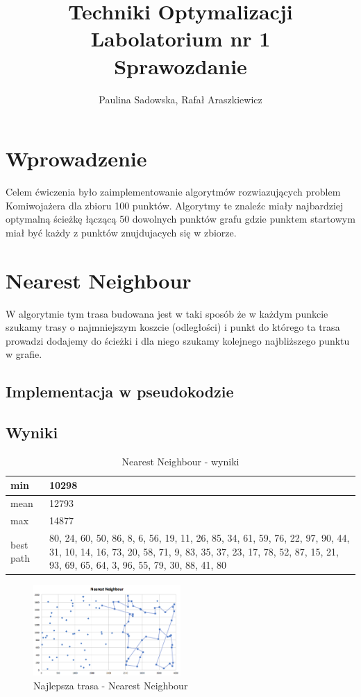 \documentclass[a4paper 10pt]{article}
\title{\textbf{Techniki Optymalizacji} \\
Labolatorium nr 1 \\
Sprawozdanie}
\author{Paulina Sadowska, Rafał Araszkiewicz}
\begin{document}
\maketitle

\section{Wprowadzenie}
Celem ćwiczenia było zaimplementowanie algorytmów rozwiazujących problem Komiwojażera dla zbioru 100 punktów. Algorytmy te znaleźc miały najbardziej optymalną ścieżkę łączącą 50 dowolnych punktów grafu gdzie punktem startowym miał być każdy z punktów znujdujacych się w zbiorze.
\section{Nearest Neighbour}
\label{Nearest}
W algorytmie tym trasa budowana jest w taki sposób że w każdym punkcie szukamy trasy o najmniejszym koszcie (odległości) i punkt do którego ta trasa prowadzi dodajemy do ścieżki i dla niego szukamy kolejnego najbliższego punktu w grafie.
\subsection{Implementacja w pseudokodzie}
\subsection{Wyniki}
\begin{table}[H]
\center
\caption{Nearest Neighbour - wyniki}
\label{Nearest Neighbour - wyniki}
\begin{tabular}{|p{1cm}|p{14cm}|}
\hline
min       & 10298 \\ \hline
mean      & 12793                                                                                                                                                                                                 \\ \hline
max       & 14877 \\ \hline
best path & 80, 24, 60, 50, 86, 8, 6, 56, 19, 11, 26, 85, 34, 61, 59, 76, 22, 97, 90, 44, 31, 10, 14, 16, 73, 20, 58, 71, 9, 83, 35, 37, 23, 17, 78, 52, 87, 15, 21, 93, 69, 65, 64, 3, 96, 55, 79, 30, 88, 41, 80 \\ \hline
\end{tabular}
\end{table}

\begin{figure} [H]
\centering
\includegraphics[angle=0,width = 0.5\textwidth, height=!]{images/NN.png}
\caption{Najlepsza trasa - Nearest Neighbour}
\label{Rys. NN}
\end{figure}
\end{document}
